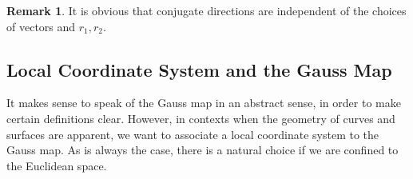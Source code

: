 \documentclass{amsart} %
\theoremstyle{mytheoremstyle}
\theoremstyle{definition}
\newtheorem{remark}[definition]{Remark}
\numberwithin{equation}{section}
\DeclareMathOperator{\1}{\mathbbm{1}}
\begin{document}
\begin{remark}
	It is obvious that conjugate directions are independent of the choices of vectors and $r_1, r_2$.
\end{remark}




\subsection{Local Coordinate System and the Gauss Map}
It makes sense to speak of the Gauss map in an abstract sense, in order to make certain definitions clear. However, in contexts when the geometry of curves and surfaces are apparent, we want to associate a local coordinate system to the Gauss map. As is always the case, there is a natural choice if we are confined to the Euclidean space.
\end{document}
